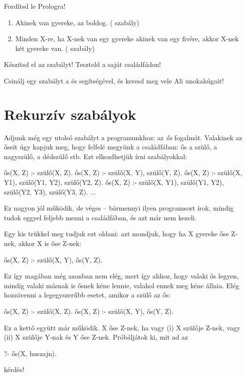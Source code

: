\begin{problem}
Fordítsd le Prologra!
\begin{enumerate}  
\item Akinek van gyereke, az boldog. (
  szabály)
\item Minden X-re, ha X-nek van egy gyereke akinek
  van egy fivére, akkor X-nek két gyereke
  van. ( szabály)
\end{enumerate}
\end{problem}
\begin{problem}
  Készítsd el az  szabályt!
  Teszteld a saját családfádon!
\end{problem}
\begin{problem}
  Csinálj egy  szabályt a 
  és  segítségével, és keresd meg vele Ali
  unokahúgait!
\end{problem}

\section{Rekurzív szabályok}

Adjunk még egy utolsó szabályt a programunkhoz: az
\emph{ős} fogalmát. Valakinek az őseit úgy kapjuk
meg, hogy felfelé megyünk a családfában: ős a szülő,
a nagyszülő, a dédszülő stb. Ezt elkezdhetjük írni
szabályokkal:
\begin{program}
ős(X, Z) :- szülő(X, Z).
ős(X, Z) :- szülő(X, Y), szülő(Y, Z).
ős(X, Z) :-
    szülő(X, Y1), szülő(Y1, Y2), szülő(Y2, Z).
ős(X, Z) :-
    szülő(X, Y1), szülő(Y1, Y2),
    szülő(Y2, Y3), szülő(Y3, Z).
...
\end{program}
Ez nagyon jól működik, de véges -- bármennyi ilyen
programsort írok, mindig tudok eggyel feljebb menni
a családfában, és azt már nem kezeli.

Egy kis trükkel meg tudjuk ezt oldani: azt mondjuk,
hogy ha X gyereke őse Z-nek, akkor X is őse Z-nek:
\begin{program}
ős(X, Z) :- szülő(X, Y), ős(Y, Z).
\end{program}
Ez így magában még azonban nem elég, mert így ahhoz,
hogy valaki ős legyen, mindig valaki másnak is ősnek
kéne lennie, valahol ennek meg kéne állnia. Elég
hozzávenni a legegyszerűbb esetet, amikor a szülő az
ős:
\begin{program}
ős(X, Z) :- szülő(X, Z).
ős(X, Z) :- szülő(X, Y), ős(Y, Z).
\end{program}
Ez a kettő együtt már működik. X őse Z-nek, ha vagy
(i) X szülője Z-nek, vagy (ii) X szülője Y-nak és Y
őse Z-nek. Próbáljátok ki, mit ad az
\begin{query}
?- ős(X, huszajn).
\end{query}
kérdés!

